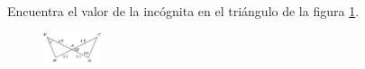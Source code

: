 Encuentra el valor de la incógnita en el triángulo de la figura \ref{fig:angle_triangle_29}.

\begin{minipage}[t][][t]{0.35\textwidth
    }\begin{figure}[H]
\centering
            \includegraphics[width=0.15\textwidth]{../images/angle_triangle_29.png}

        \caption{}
        \label{fig:angle_triangle_29}
    \end{figure}
\end{minipage}\hfill
\begin{minipage}[t][][t]{0.6\textwidth}
    \begin{solutionbox}{4.5cm}

    \end{solutionbox}
\end{minipage}
